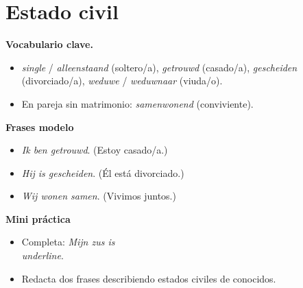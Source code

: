 \section{Estado civil}
\textbf{Vocabulario clave.}
\begin{itemize}[leftmargin=*]
  \item \textit{single} / \textit{alleenstaand} (soltero/a), \textit{getrouwd} (casado/a), \textit{gescheiden} (divorciado/a), \textit{weduwe} / \textit{weduwnaar} (viuda/o).
  \item En pareja sin matrimonio: \textit{samenwonend} (conviviente).
\end{itemize}

\textbf{Frases modelo}
\begin{itemize}[leftmargin=*]
  \item \textit{Ik ben getrouwd}. (Estoy casado/a.)
  \item \textit{Hij is gescheiden}. (Él está divorciado.)
  \item \textit{Wij wonen samen}. (Vivimos juntos.)
\end{itemize}

\textbf{Mini práctica}
\begin{itemize}[leftmargin=*]
  \item Completa: \textit{Mijn zus is \\underline{\hspace{1.2cm}}}.
  \item Redacta dos frases describiendo estados civiles de conocidos.
\end{itemize}
